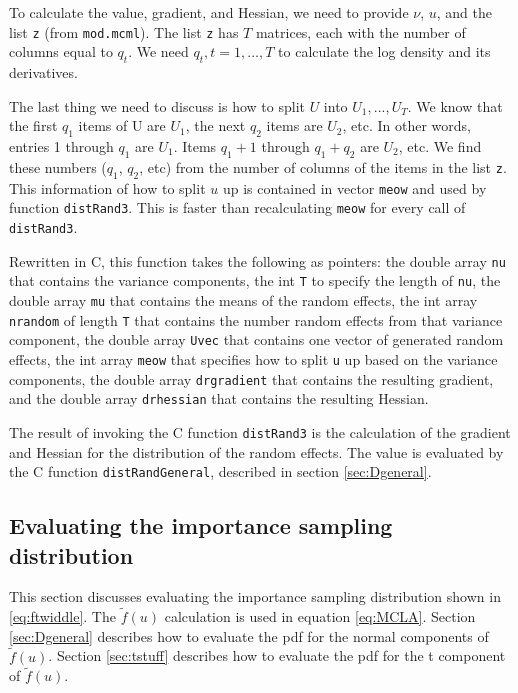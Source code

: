 \documentclass{article}
\begin{document}
To calculate the value, gradient, and Hessian, we need to provide  $\nu$, $u$, and the list \texttt{z} (from \texttt{mod.mcml}).  The list \texttt{z} has $T$ matrices, each with the number of columns equal to $q_t$. We need $q_t,t=1,\ldots,T$ to calculate the log density and its derivatives.



The last thing we need to discuss is how to split $U$ into $U_1,...,U_T$. We know that the first $q_1$ items of U are $U_1$, the next $q_2$ items are $U_2$, etc.  In other words, entries 1 through $q_1$ are $U_1$. Items $q_1+1$ through $q_1+q_2$ are $U_2$, etc. We find these numbers ($q_1$, $q_2$, etc) from the number of columns of the items in the list \texttt{z}. This information of how to split $u$ up is contained in vector \texttt{meow} and used by function \texttt{distRand3}. This is faster than recalculating \texttt{meow} for every call of \texttt{distRand3}. 

Rewritten in C, this function takes the following as pointers: the double array \texttt{nu} that contains the variance components, the int \texttt{T} to specify the length of \texttt{nu}, the double array \texttt{mu} that contains the means of the random effects, the int array \texttt{nrandom} of length \texttt{T} that contains the number random effects from that variance component, the double array \texttt{Uvec} that contains one vector of generated random effects,  the int array \texttt{meow} that specifies how to split \texttt{u} up based on the variance components, the double array \texttt{drgradient} that  contains the resulting gradient, and the double array \texttt{drhessian} that  contains the resulting Hessian.

The result of invoking the C function \texttt{distRand3} is  the calculation of the gradient and Hessian for the distribution of the random effects. The value is  evaluated by the C function \texttt{distRandGeneral}, described in section \ref{sec:Dgeneral}.



\subsection{Evaluating the importance sampling distribution}
This section discusses evaluating the importance sampling distribution shown in \ref{eq:ftwiddle}. The  $\tilde{f}(u)$ calculation is used in equation \ref{eq:MCLA}.  Section \ref{sec:Dgeneral} describes how to evaluate the pdf for the normal components of $\tilde{f}(u)$. Section \ref{sec:tstuff} describes how to evaluate the pdf for the t component of $\tilde{f}(u)$. 
\end{document}

